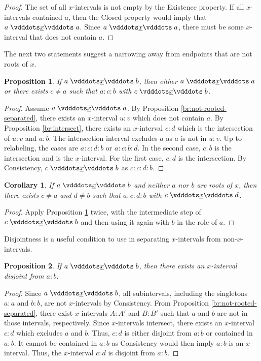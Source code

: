 \documentclass{rmj-public}
\newtheorem{corollary}{Corollary}[section]
\newtheorem{proposition}{Proposition}[section]
\begin{document}
\begin{proof}
    The set of all $x$-intervals is not empty by the Existence property. If all $x$-intervals contained $a$, then the Closed property would imply that $a \xrel a$. Since  \sout{$a \xrel a$}, there must be some $x$-interval that does not contain $a$. 
\end{proof}

The next two statements suggest a narrowing away from endpoints that are not roots of $x$. 

\begin{proposition}\label{br:something-inside}
    If $a \xrel b$, then either $a \xrel a$ or there exists $c \neq a$ such that $a : c : b$ with $c \xrel b$. 
\end{proposition}

\begin{proof}
    Assume \sout{$a \xrel a$}. By Proposition \ref{br:not-rooted-separated}, there exists an $x$-interval $u:v$ which does not contain $a$. By Proposition \ref{br:intersect}, there exists an $x$-interval  $c:d$ which is the intersection of $u:v$ and $a:b$. The intersection interval excludes $a$ as $a$ is not in $u:v$. Up to relabeling, the cases are $a:c:d:b$ or $a:c:b:d$. In the second case, $c:b$ is the intersection and is the $x$-interval. For the first case, $c:d$ is the intersection. By Consistency, $c \xrel b$ as $c:c:d:b$. 
\end{proof}

\begin{corollary}\label{br:doublesomething-inside}
    If $a \xrel b$ and neither $a$ nor $b$ are roots of $x$, then there exists $c \neq a$ and $d \neq b$ such that $a : c : d : b$ with $c \xrel d$. 
\end{corollary}

\begin{proof}
Apply Proposition \ref{br:something-inside} twice, with the intermediate step of $c \xrel b$ and then using it again with $b$ in the role of $a$. 
\end{proof}

Disjointness is a useful condition to use in separating $x$-intervals from non-$x$-intervals. 

\begin{proposition}\label{br:something-outside}
    If \sout{$a \xrel b$}, then there exists an $x$-interval disjoint from $a:b$.
\end{proposition}

\begin{proof}
    Since \sout{$a \xrel b$}, all subintervals, including the singletons $a:a$ and $b:b$, are not $x$-intervals by Consistency. From Proposition \ref{br:not-rooted-separated}, there exist $x$-intervals $A:A'$ and $B:B'$ such that $a$ and $b$ are not in those intervals, respectively. Since $x$-intervals intersect, there exists an $x$-interval $c:d$ which excludes $a$ and $b$. Thus, $c:d$ is either disjoint from $a:b$ or contained in $a:b$. It cannot be contained in $a:b$ as Consistency would then imply $a:b$ is an $x$-interval. Thus, the $x$-interval $c:d$ is disjoint from $a:b$.
\end{proof}
\end{document}
